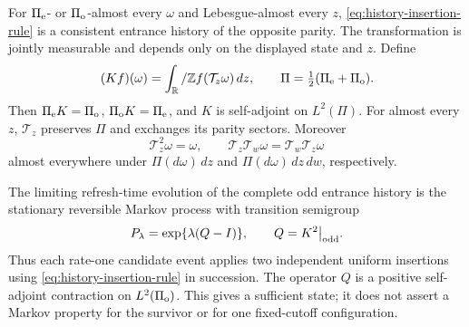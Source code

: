 \documentclass[11pt,letterpaper]{article}
\newcommand{\T}{\mathbb R/\mathbb Z}\newcommand{\Leb}{\operatorname{Leb}}
\begin{document}
\begin{theorem}
\label{thm:history-markov}
For $\Pi_{\rm e}$- or $\Pi_{\rm o}$-almost every $\omega$ and
Lebesgue-almost every $z$, \eqref{eq:history-insertion-rule} is a
consistent entrance history of the opposite parity. The transformation
is jointly measurable and depends only on the displayed state and $z$.
Define
\[
 (Kf)(\omega)=\int_\T f(\mathcal T_z\omega)\,dz,
 \qquad \Pi=\tfrac12(\Pi_{\rm e}+\Pi_{\rm o}).
\]
Then $\Pi_{\rm e}K=\Pi_{\rm o}$, $\Pi_{\rm o}K=\Pi_{\rm e}$,
and $K$ is self-adjoint on $L^2(\Pi)$.
For almost every $z$, $\mathcal T_z$ preserves $\Pi$ and exchanges
its parity sectors. Moreover
\begin{equation}\label{eq:insertion-involutions}
 \mathcal T_z^2\omega=\omega,\qquad
 \mathcal T_z\mathcal T_w\omega=\mathcal T_w\mathcal T_z\omega
\end{equation}
almost everywhere under $\Pi(d\omega)\,dz$ and
$\Pi(d\omega)\,dz\,dw$, respectively.

The limiting refresh-time evolution of the complete odd entrance
history is the stationary reversible Markov process with transition
semigroup
\begin{equation}\label{eq:history-refresh-semigroup}
 P_\lambda=\exp\{\lambda(Q-I)\},\qquad
 Q=K^2\big|_{\rm odd}.
\end{equation}
Thus each rate-one candidate event applies two independent uniform
insertions using \eqref{eq:history-insertion-rule} in succession.
The operator $Q$ is a positive self-adjoint contraction on
$L^2(\Pi_{\rm o})$.
This gives a sufficient state; it does not assert a Markov property
for the survivor or for one fixed-cutoff configuration.
\end{theorem}
\end{document}
